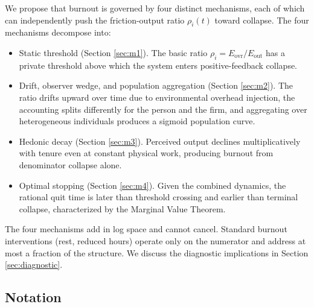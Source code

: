 \documentclass[11pt]{article}
\begin{document}
We propose that burnout is governed by four distinct mechanisms, each of
which can independently push the friction-output ratio $\rho_i(t)$ toward
collapse. The four mechanisms decompose into:
\begin{itemize}
\item[\textbf{M1.}] Static threshold (Section \ref{sec:m1}). The basic ratio
$\rho_i = E_{\text{ovr}} / E_{\text{out}}$ has a private threshold above which
the system enters positive-feedback collapse.
\item[\textbf{M2.}] Drift, observer wedge, and population aggregation
(Section \ref{sec:m2}). The ratio drifts upward over time due to environmental
overhead injection, the accounting splits differently for the person and the
firm, and aggregating over heterogeneous individuals produces a sigmoid
population curve.
\item[\textbf{M3.}] Hedonic decay (Section \ref{sec:m3}). Perceived output
declines multiplicatively with tenure even at constant physical work,
producing burnout from denominator collapse alone.
\item[\textbf{M4.}] Optimal stopping (Section \ref{sec:m4}). Given the
combined dynamics, the rational quit time is later than threshold crossing
and earlier than terminal collapse, characterized by the Marginal Value
Theorem.
\end{itemize}

The four mechanisms add in log space and cannot cancel. Standard burnout
interventions (rest, reduced hours) operate only on the numerator and address
at most a fraction of the structure. We discuss the diagnostic implications
in Section \ref{sec:diagnostic}.

\subsection*{Notation}
\end{document}
